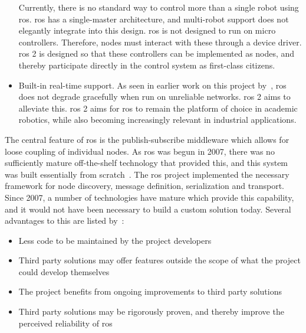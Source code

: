\documentclass[\rootfolder/main.tex]{subfiles}
\begin{document}
\begin{itemize}
        Currently, there is no standard way to control more than a single robot using \acrshort{ros}.
        \acrshort{ros} has a single-master architecture, and multi-robot support does not elegantly integrate into this design.
        \acrshort{ros} is not designed to run on micro controllers. Therefore, nodes must interact with these through a device driver.
        \acrshort{ros} 2 is designed so that these controllers can be implemented as nodes, and thereby participate directly in the control system as first-class citizens.
    \item{Built-in real-time support.}
        As seen in earlier work on this project by~\cite{Waløen2017}, \acrshort{ros} does not degrade gracefully when run on unreliable networks.
        \acrshort{ros} 2 aims to alleviate this.
        \acrshort{ros} 2 aims for \acrshort{ros} to remain the platform of choice in academic robotics, while also becoming increasingly relevant in industrial applications.
\end{itemize}

The central feature of \acrshort{ros} is the publish-subscribe middleware which allows for loose coupling of individual nodes.
As \acrshort{ros} was begun in 2007, there was no sufficiently mature off-the-shelf technology that provided this, and this system was built essentially from scratch~\cite{Gerkey2017}.
The \acrshort{ros} project implemented the necessary framework for node discovery, message definition, serialization and transport.
Since 2007, a number of technologies have mature which provide this capability, and it would not have been necessary to build a custom solution today.
Several advantages to this are listed by~\cite{Gerkey2017}:

\begin{itemize}
    \item Less code to be maintained by the project developers
    \item Third party solutions may offer features outside the scope of what the project could develop themselves
    \item The project benefits from ongoing improvements to third party solutions
    \item Third party solutions may be rigorously proven, and thereby improve the perceived reliability of \acrshort{ros}
\end{itemize}
\end{document}
